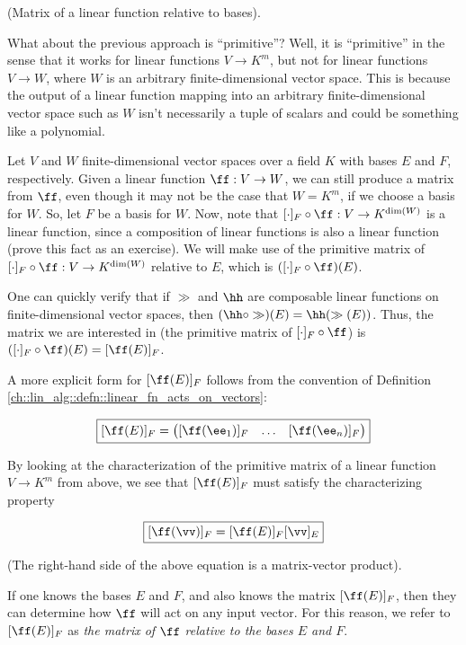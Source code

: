\begin{deriv}
\label{ch::lin_alg::deriv::matrix_wrt_bases}
    (Matrix of a linear function relative to bases).
    
    What about the previous approach is ``primitive''? Well, it is ``primitive'' in the sense that it works for linear functions $V \rightarrow K^m$, but not for linear functions $V \rightarrow W$, where $W$ is an arbitrary finite-dimensional vector space. This is because the output of a linear function mapping into an arbitrary finite-dimensional vector space such as $W$ isn't necessarily a tuple of scalars and could be something like a polynomial.
    
    Let $V$ and $W$ finite-dimensional vector spaces over a field $K$ with bases $E$ and $F$, respectively. Given a linear function $\ff:V \rightarrow W$, we can still produce a matrix from $\ff$, even though it may not be the case that $W = K^m$, if we choose a basis for $W$. So, let $F$ be a basis for $W$. Now, note that $[\cdot]_F \circ \ff:V \rightarrow K^{\dim(W)}$ is a linear function, since a composition of linear functions is also a linear function (prove this fact as an exercise). We will make use of the primitive matrix of $[\cdot]_F \circ \ff:V \rightarrow K^{\dim(W)}$ relative to $E$, which is $([\cdot]_F \circ \ff)(E)$. 
    
    One can quickly verify that if $\gg$ and $\hh$ are composable linear functions on finite-dimensional vector spaces, then $(\hh \circ \gg)(E) = \hh(\gg(E))$. Thus, the matrix we are interested in (the primitive matrix of $[\cdot]_F \circ \ff$) is $([\cdot]_F \circ \ff)(E) = [\ff(E)]_F$.
    
    A more explicit form for $[\ff(E)]_F$ follows from the convention of Definition \ref{ch::lin_alg::defn::linear_fn_acts_on_vectors}:
    
    \begin{align*}
        \boxed
        {
            [\ff(E)]_F = \begin{pmatrix} [\ff(\ee_1)]_F & \hdots & [\ff(\ee_n)]_F \end{pmatrix}
        }
    \end{align*}
    
    By looking at the characterization of the primitive matrix of a linear function $V \rightarrow K^m$ from above, we see that $[\ff(E)]_F$ must satisfy the characterizing property
    
    \begin{align*}
        \boxed
        {
            [\ff(\vv)]_F = [\ff(E)]_F [\vv]_E
        }
    \end{align*}
    
    (The right-hand side of the above equation is a matrix-vector product).
    
    If one knows the bases $E$ and $F$, and also knows the matrix $[\ff(E)]_F$, then they can determine how $\ff$ will act on any input vector. For this reason, we refer to $[\ff(E)]_F$ as \textit{the matrix of $\ff$ relative to the bases $E$ and $F$}.
\end{deriv}

